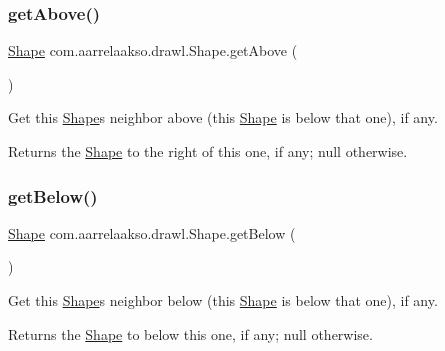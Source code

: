 \subsubsection{\texorpdfstring{get\+Above()}{getAbove()}}
{\footnotesize\ttfamily \hyperlink{classcom_1_1aarrelaakso_1_1drawl_1_1_shape}{Shape} com.\+aarrelaakso.\+drawl.\+Shape.\+get\+Above (\begin{DoxyParamCaption}{ }\end{DoxyParamCaption})}



Get this \hyperlink{classcom_1_1aarrelaakso_1_1drawl_1_1_shape}{Shape}\textquotesingle{}s neighbor above (this \hyperlink{classcom_1_1aarrelaakso_1_1drawl_1_1_shape}{Shape} is below that one), if any. 

\begin{DoxyReturn}{Returns}
the \hyperlink{classcom_1_1aarrelaakso_1_1drawl_1_1_shape}{Shape} to the right of this one, if any; {\ttfamily null} otherwise. 
\end{DoxyReturn}
\mbox{\label{classcom_1_1aarrelaakso_1_1drawl_1_1_shape_a53de5ab609d879719cd3b372dfe8df58}} 
\subsubsection{\texorpdfstring{get\+Below()}{getBelow()}}
{\footnotesize\ttfamily \hyperlink{classcom_1_1aarrelaakso_1_1drawl_1_1_shape}{Shape} com.\+aarrelaakso.\+drawl.\+Shape.\+get\+Below (\begin{DoxyParamCaption}{ }\end{DoxyParamCaption})}



Get this \hyperlink{classcom_1_1aarrelaakso_1_1drawl_1_1_shape}{Shape}\textquotesingle{}s neighbor below (this \hyperlink{classcom_1_1aarrelaakso_1_1drawl_1_1_shape}{Shape} is below that one), if any. 

\begin{DoxyReturn}{Returns}
the \hyperlink{classcom_1_1aarrelaakso_1_1drawl_1_1_shape}{Shape} to below this one, if any; {\ttfamily null} otherwise. 
\end{DoxyReturn}
\mbox{\label{classcom_1_1aarrelaakso_1_1drawl_1_1_shape_aba14efe9a16c0808580963c66b171082}} 
